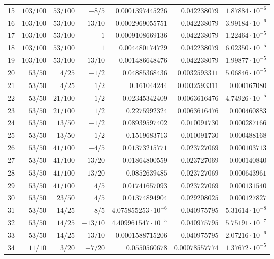 \documentclass[11pt,reqno]{amsart}
\numberwithin{equation}{section}
\theoremstyle{definition}
\theoremstyle{remark}
\begin{document}
\begin{center}
\begin{longtable}{@{}rrrrrrr@{}}
15 & $103/100$ & $53/100$ & $-8/5$ & $0.0001397445226$ & $0.042238079$ & $1.87884\cdot10^{-6}$\\
16 & $103/100$ & $53/100$ & $-13/10$ & $0.0002969055751$ & $0.042238079$ & $3.99184\cdot10^{-6}$\\
17 & $103/100$ & $53/100$ & $-1$ & $0.0009108669136$ & $0.042238079$ & $1.22464\cdot10^{-5}$\\
18 & $103/100$ & $53/100$ & $1$ & $0.004480174729$ & $0.042238079$ & $6.02350\cdot10^{-5}$\\
19 & $103/100$ & $53/100$ & $13/10$ & $0.001486648476$ & $0.042238079$ & $1.99877\cdot10^{-5}$\\
20 & $53/50$ & $4/25$ & $-1/2$ & $0.04885368436$ & $0.0032593311$ & $5.06846\cdot10^{-5}$\\
21 & $53/50$ & $4/25$ & $1/2$ & $0.161044244$ & $0.0032593311$ & $0.000167080$\\
22 & $53/50$ & $21/100$ & $-1/2$ & $0.02345342409$ & $0.0063616476$ & $4.74926\cdot10^{-5}$\\
23 & $53/50$ & $21/100$ & $1/2$ & $0.2275992324$ & $0.0063616476$ & $0.000460883$\\
24 & $53/50$ & $13/50$ & $-1/2$ & $0.08939597402$ & $0.010091730$ & $0.000287166$\\
25 & $53/50$ & $13/50$ & $1/2$ & $0.1519683713$ & $0.010091730$ & $0.000488168$\\
26 & $53/50$ & $41/100$ & $-4/5$ & $0.01373215771$ & $0.023727069$ & $0.000103713$\\
27 & $53/50$ & $41/100$ & $-13/20$ & $0.01864800559$ & $0.023727069$ & $0.000140840$\\
28 & $53/50$ & $41/100$ & $13/20$ & $0.0852639485$ & $0.023727069$ & $0.000643961$\\
29 & $53/50$ & $41/100$ & $4/5$ & $0.01741657093$ & $0.023727069$ & $0.000131540$\\
30 & $53/50$ & $23/50$ & $4/5$ & $0.01374894904$ & $0.029208025$ & $0.000127827$\\
31 & $53/50$ & $14/25$ & $-8/5$ & $4.075855253\cdot10^{-6}$ & $0.040975795$ & $5.31614\cdot10^{-8}$\\
32 & $53/50$ & $14/25$ & $-13/10$ & $4.409961547\cdot10^{-5}$ & $0.040975795$ & $5.75191\cdot10^{-7}$\\
33 & $53/50$ & $14/25$ & $13/10$ & $0.0001588715206$ & $0.040975795$ & $2.07216\cdot10^{-6}$\\
34 & $11/10$ & $3/20$ & $-7/20$ & $0.0550560678$ & $0.00078557774$ & $1.37672\cdot10^{-5}$\\

\end{longtable}
\end{center}
\end{document}
